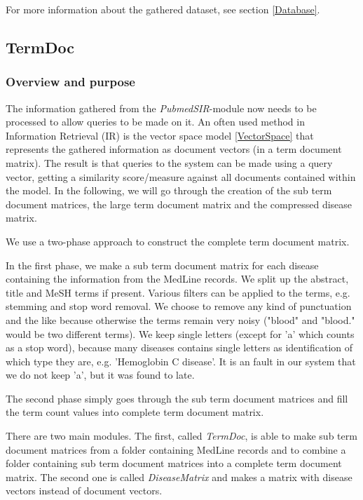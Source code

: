 For more information about the gathered dataset, see section \ref{Database}.

\subsection{TermDoc\label{TermDoc}}

\subsubsection{Overview and purpose}
The information gathered from the \textit{PubmedSIR}-module now needs to be
processed to allow queries to be made on it. An often used method in
Information Retrieval (IR) is the vector space model \ref{VectorSpace}
that represents the gathered information as document vectors (in a
term document matrix). The result is that queries to the system can be
made using a query vector, getting a similarity score/measure against
all documents contained within the model. In the following, we will go
through the creation of the sub term document matrices, the large term
document matrix and the compressed disease matrix.

We use a two-phase approach to construct the complete term document
matrix.

In the first phase, we make a sub term document matrix for each
disease containing the information from the MedLine records. We split
up the abstract, title and MeSH terms if present. Various filters can
be applied to the terms, e.g. stemming and stop word removal. We
choose to remove any kind of punctuation and the like because
otherwise the terms remain very noisy ("blood" and "blood." would be
two different terms). We keep single letters (except for 'a' which
counts as a stop word), because many diseases contains single letters
as identification of which type they are, e.g. 'Hemoglobin C
disease'. It is an fault in our system that we do not keep 'a', but it
was found to late.

The second phase simply goes through the sub term document matrices
and fill the term count values into complete term document matrix.

There are two main modules. The first, called \textit{TermDoc}, is
able to make sub term document matrices from a folder containing
MedLine records and to combine a folder containing sub term document
matrices into a complete term document matrix. The second one is
called \textit{DiseaseMatrix} and makes a matrix with disease vectors
instead of document vectors.

